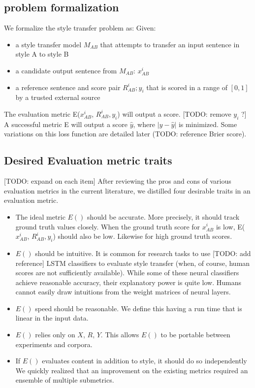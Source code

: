 \documentclass[letterpaper, 10 pt, conference]{ieeeconf}  %
\begin{document}
  \subsection{problem formalization} We formalize the style transfer problem as:
    Given:
    \begin{itemize}
      \item a style transfer model $M_{AB}$ that attempts to transfer an input sentence in style A to style B
      \item a candidate output sentence from $M_{AB}$:  $x_{AB}^i$
      \item a reference sentence and score pair $R_{AB}^i ; y_i$ that is scored in a range of $[0,1]$ by a trusted external source
    \end{itemize}

  The evaluation metric E($x_{AB}^i$, $R_{AB}^i, y_i$) will output a score. [TODO: remove $y_i$ ?] A successful metric E will output a score $\hat{y}$, where $|y-\hat{y}|$ is minimized. Some variations on this loss function are detailed later (TODO: reference Brier score).
  \subsection{Desired Evaluation metric traits}
      [TODO: expand on each item]
      After reviewing the pros and cons of various evaluation metrics in the current literature, we distilled four desirable traits in an evaluation metric.
    \begin{itemize}

      \item The ideal metric $E()$ should be accurate. More precisely, it should track ground truth values closely. When the ground truth score for $x_{AB}^i$ is low, E($x_{AB}^i$, $R_{AB}^i, y_i$) should also be low. Likewise for high ground truth scores.
      \item $E()$ should be intuitive. It is common for research tasks to use [TODO: add reference] LSTM classifiers to evaluate style transfer (when, of course, human scores are not sufficiently available). While some of these neural classifiers achieve reasonable accuracy, their explanatory power is quite low. Humans cannot easily draw intuitions from the weight matrices of neural layers.
      \item $E()$ speed should be reasonable. We define this having a run time that is linear in the input data.
      \item $E()$ relies only on $X$, $R$, $Y$. This allows $E()$ to be portable between experiments and corpora.
      \item If $E()$ evaluates content in addition to style, it should do so independently
      We quickly realized that an improvement on the existing metrics required an ensemble of multiple submetrics.
    \end{itemize}
\end{document}
